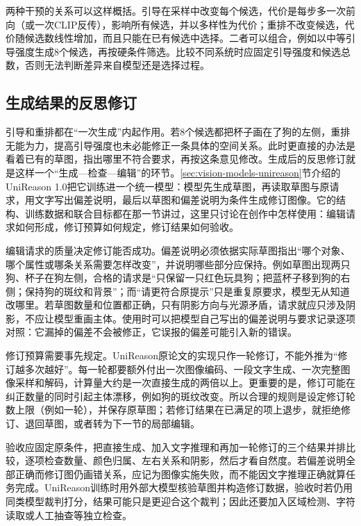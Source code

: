 两种干预的关系可以这样概括。引导在采样中改变每个候选，代价是每步多一次前向（或一次CLIP反传），影响所有候选，并以多样性为代价；重排不改变候选，代价随候选数线性增加，而且只能在已有候选中选择。二者可以组合，例如以中等引导强度生成8个候选，再按硬条件筛选。比较不同系统时应固定引导强度和候选总数，否则无法判断差异来自模型还是选择过程。

\subsection{生成结果的反思修订}
\label{sec:vision-generation-unireason-refinement}

引导和重排都在“一次生成”内起作用。若8个候选都把杯子画在了狗的左侧，重排无能为力，提高引导强度也未必能修正一条具体的空间关系。此时更直接的办法是看着已有的草图，指出哪里不符合要求，再按这条意见修改。生成后的反思修订就是这样一个“生成—检查—编辑”的环节。\ref{sec:vision-models-unireason}节介绍的UniReason 1.0把它训练进一个统一模型：模型先生成草图，再读取草图与原请求，用文字写出偏差说明，最后以草图和偏差说明为条件生成修订图像。它的结构、训练数据和联合目标都在那一节讲过，这里只讨论在创作中怎样使用：编辑请求如何形成，修订预算如何规定，修订结果如何验收。

编辑请求的质量决定修订能否成功。偏差说明必须依据实际草图指出“哪个对象、哪个属性或哪条关系需要怎样改变”，并说明哪些部分应保持。例如草图出现两只狗、杯子在狗左侧，合格的请求是“只保留一只红色玩具狗；把蓝杯子移到狗的右侧；保持狗的斑纹和背景”；而“请更符合原提示”只是重复原要求，模型无从知道改哪里。若草图数量和位置都正确，只有阴影方向与光源矛盾，请求就应只涉及阴影，不应让模型重画主体。使用时可以把模型自己写出的偏差说明与要求记录逐项对照：它漏掉的偏差不会被修正，它误报的偏差可能引入新的错误。

修订预算需要事先规定。UniReason原论文的实现只作一轮修订，不能外推为“修订越多次越好”。每一轮都要额外付出一次图像编码、一段文字生成、一次完整图像采样和解码，计算量大约是一次直接生成的两倍以上。更重要的是，修订可能在纠正数量的同时引起主体漂移，例如狗的斑纹改变。所以合理的规则是设定修订轮数上限（例如一轮），并保存原草图；若修订结果在已满足的项上退步，就拒绝修订、退回草图，或者转为下一节的局部编辑。

验收应固定原条件，把直接生成、加入文字推理和再加一轮修订的三个结果并排比较，逐项检查数量、颜色归属、左右关系和阴影，然后才看自然度。若偏差说明全部正确而修订图仍画错关系，应记为图像实施失败，而不能因文字推理正确就算任务完成。UniReason训练时用外部大模型核验草图并构造修订数据，验收时若仍用同类模型裁判打分，结果可能只是更迎合这个裁判；因此还要加入区域检测、字符读取或人工抽查等独立检查。

